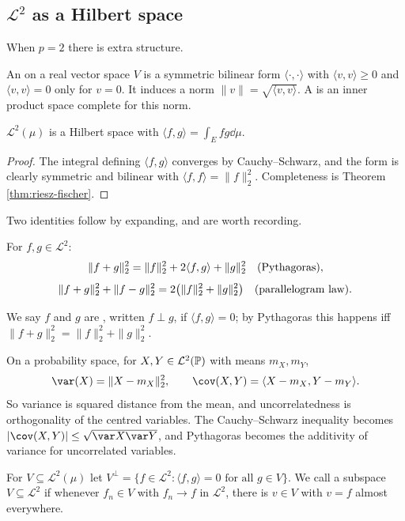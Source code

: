 \documentclass[a4paper]{scrartcl}
\newcommand{\cL}{\mathcal{L}}
\newcommand{\ip}[2]{\langle #1, #2 \rangle}
\begin{document}
\subsection{\texorpdfstring{$\cL^2$}{L2} as a Hilbert space}

When $p=2$ there is extra structure.

\begin{definition}
	An  on a real vector space $V$ is a symmetric bilinear form $\ip{\cdot}{\cdot}$ with $\ip{v}{v} \geq 0$ and $\ip{v}{v}=0$ only for $v = 0$. It induces a norm $\|v\|=\sqrt{\ip{v}{v}}$. A  is an inner product space complete for this norm.
\end{definition}

\begin{corollary}
	$\cL^2(\mu)$ is a Hilbert space with $\ip{f}{g} = \int_E fg\dd\mu$.
\end{corollary}
\begin{proof}
	The integral defining $\ip{f}{g}$ converges by Cauchy--Schwarz, and the form is clearly symmetric and bilinear with $\ip{f}{f}=\|f\|_2^2$. Completeness is Theorem \ref{thm:riesz-fischer}.
\end{proof}

Two identities follow by expanding, and are worth recording.

\begin{lemma}
	For $f,g\in\cL^2$:
	$$
	\|f+g\|_2^2 = \|f\|_2^2 + 2\ip{f}{g}+\|g\|_2^2 \quad \textup{(Pythagoras)},
	$$
	$$
	\|f+g\|_2^2 + \|f-g\|_2^2 = 2\big(\|f\|_2^2+\|g\|_2^2\big) \quad \textup{(parallelogram law)}.
	$$
\end{lemma}

We say $f$ and $g$ are , written $f \perp g$, if $\ip{f}{g}=0$; by Pythagoras this happens iff $\|f+g\|_2^2=\|f\|_2^2+\|g\|_2^2$.

\begin{example}
	On a probability space, for $X,Y \in \cL^2(\PP)$ with means $m_X, m_Y$,
	$$
	\var(X) = \|X - m_X\|_2^2, \qquad \cov(X,Y) = \ip{X-m_X}{Y-m_Y}.
	$$
	So variance is squared distance from the mean, and uncorrelatedness is orthogonality of the centred variables. The Cauchy--Schwarz inequality becomes $|\cov(X,Y)|\leq\sqrt{\var X \var Y}$, and Pythagoras becomes the additivity of variance for uncorrelated variables.
\end{example}

\begin{definition}
	For $V\subseteq \cL^2(\mu)$ let $V^\perp = \{f \in \cL^2 : \ip{f}{g} = 0 \text{ for all } g \in V\}$. We call a subspace $V \subseteq \cL^2$  if whenever $f_n \in V$ with $f_n \to f$ in $\cL^2$, there is $v \in V$ with $v = f$ almost everywhere.
\end{definition}
\end{document}
